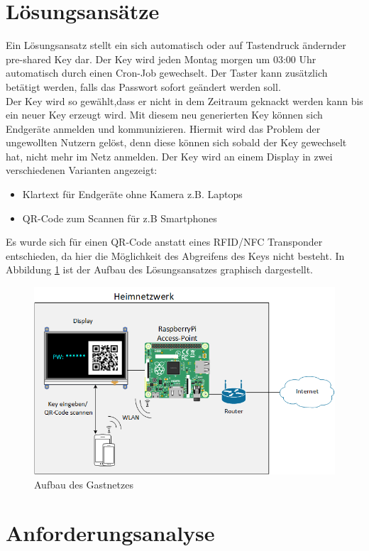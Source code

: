 \documentclass[a4paper,11pt,singlespacing]{article}
\begin{document}
	\section{Lösungsansätze}
	Ein Lösungsansatz stellt ein sich automatisch oder auf Tastendruck ändernder pre-shared Key dar. Der Key wird jeden Montag morgen um 03:00 Uhr automatisch durch einen Cron-Job gewechselt. Der Taster kann zusätzlich betätigt werden, falls das Passwort sofort geändert werden soll. \\ 
	Der Key wird so gewählt,dass er nicht in dem Zeitraum geknackt werden kann bis ein neuer Key erzeugt wird. Mit diesem neu generierten Key können sich Endgeräte anmelden und kommunizieren. Hiermit wird das Problem der ungewollten Nutzern gelöst, denn diese können sich sobald der Key gewechselt hat, nicht mehr im Netz anmelden. Der Key wird an einem Display in zwei verschiedenen Varianten angezeigt:
	\begin{itemize}
		\item Klartext für Endgeräte ohne Kamera z.B. Laptops
		\item QR-Code zum Scannen für z.B Smartphones
	\end{itemize}

	Es wurde sich für einen QR-Code anstatt eines RFID/NFC Transponder entschieden, da hier die Möglichkeit des Abgreifens des Keys nicht besteht. In Abbildung  \ref{aufbau} ist der Aufbau des Lösungsansatzes graphisch dargestellt.

	\begin{figure}[ht]
		\centering
		\includegraphics[scale=0.6]{skizze}
			\caption{Aufbau des Gastnetzes}
			\label{aufbau}
	\end{figure}

	
	\section{Anforderungsanalyse}
\end{document}
